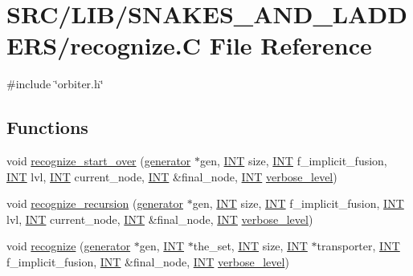 \hypertarget{recognize_8_c}{}\section{S\+R\+C/\+L\+I\+B/\+S\+N\+A\+K\+E\+S\+\_\+\+A\+N\+D\+\_\+\+L\+A\+D\+D\+E\+R\+S/recognize.C File Reference}
\label{recognize_8_c}
{\ttfamily \#include \char`\"{}orbiter.\+h\char`\"{}}\newline
\subsection*{Functions}
\begin{DoxyCompactItemize}
\item 
void \mbox{\hyperlink{recognize_8_c_a0b485aaa256987a8c2ebb559618e891f}{recognize\+\_\+start\+\_\+over}} (\mbox{\hyperlink{classgenerator}{generator}} $\ast$gen, \mbox{\hyperlink{galois_8h_a09fddde158a3a20bd2dcadb609de11dc}{I\+NT}} size, \mbox{\hyperlink{galois_8h_a09fddde158a3a20bd2dcadb609de11dc}{I\+NT}} f\+\_\+implicit\+\_\+fusion, \mbox{\hyperlink{galois_8h_a09fddde158a3a20bd2dcadb609de11dc}{I\+NT}} lvl, \mbox{\hyperlink{galois_8h_a09fddde158a3a20bd2dcadb609de11dc}{I\+NT}} current\+\_\+node, \mbox{\hyperlink{galois_8h_a09fddde158a3a20bd2dcadb609de11dc}{I\+NT}} \&final\+\_\+node, \mbox{\hyperlink{galois_8h_a09fddde158a3a20bd2dcadb609de11dc}{I\+NT}} \mbox{\hyperlink{simeon_8_c_a818073fbcc2f439e7c56952f67386122}{verbose\+\_\+level}})
\item 
void \mbox{\hyperlink{recognize_8_c_a08d856f7a06178e6ea5f6c27f6a7b6e2}{recognize\+\_\+recursion}} (\mbox{\hyperlink{classgenerator}{generator}} $\ast$gen, \mbox{\hyperlink{galois_8h_a09fddde158a3a20bd2dcadb609de11dc}{I\+NT}} size, \mbox{\hyperlink{galois_8h_a09fddde158a3a20bd2dcadb609de11dc}{I\+NT}} f\+\_\+implicit\+\_\+fusion, \mbox{\hyperlink{galois_8h_a09fddde158a3a20bd2dcadb609de11dc}{I\+NT}} lvl, \mbox{\hyperlink{galois_8h_a09fddde158a3a20bd2dcadb609de11dc}{I\+NT}} current\+\_\+node, \mbox{\hyperlink{galois_8h_a09fddde158a3a20bd2dcadb609de11dc}{I\+NT}} \&final\+\_\+node, \mbox{\hyperlink{galois_8h_a09fddde158a3a20bd2dcadb609de11dc}{I\+NT}} \mbox{\hyperlink{simeon_8_c_a818073fbcc2f439e7c56952f67386122}{verbose\+\_\+level}})
\item 
void \mbox{\hyperlink{recognize_8_c_ade3d93a01c9f55023b0050a9f7cd6189}{recognize}} (\mbox{\hyperlink{classgenerator}{generator}} $\ast$gen, \mbox{\hyperlink{galois_8h_a09fddde158a3a20bd2dcadb609de11dc}{I\+NT}} $\ast$the\+\_\+set, \mbox{\hyperlink{galois_8h_a09fddde158a3a20bd2dcadb609de11dc}{I\+NT}} size, \mbox{\hyperlink{galois_8h_a09fddde158a3a20bd2dcadb609de11dc}{I\+NT}} $\ast$transporter, \mbox{\hyperlink{galois_8h_a09fddde158a3a20bd2dcadb609de11dc}{I\+NT}} f\+\_\+implicit\+\_\+fusion, \mbox{\hyperlink{galois_8h_a09fddde158a3a20bd2dcadb609de11dc}{I\+NT}} \&final\+\_\+node, \mbox{\hyperlink{galois_8h_a09fddde158a3a20bd2dcadb609de11dc}{I\+NT}} \mbox{\hyperlink{simeon_8_c_a818073fbcc2f439e7c56952f67386122}{verbose\+\_\+level}})
\end{DoxyCompactItemize}


